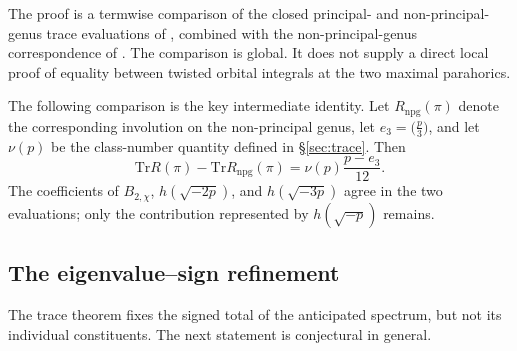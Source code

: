 \documentclass[11pt]{amsart}
\theoremstyle{plain}
\theoremstyle{definition}
\newcommand{\Tr}{\mathrm{Tr}}
\begin{document}
	The proof is a termwise comparison of the closed principal- and
	non-principal-genus trace evaluations of
	\cite{IbukiyamaKatsura,Ibukiyama2019quinary}, combined with the
	non-principal-genus correspondence of \cite{DPRT,Ibukiyama-dim}. The
	comparison is global. It does not supply a direct local proof of equality
	between twisted orbital integrals at the two maximal parahorics.
	
	The following comparison is the key intermediate identity. Let
	$R_{\mathrm{npg}}(\pi)$ denote the corresponding involution on the
	non-principal genus, let $e_3=\bigl(\frac p3\bigr)$, and let $\nu(p)$ be
	the class-number quantity defined in \S\ref{sec:trace}. Then
	\begin{equation}\label{eq:genus-comparison}
		\Tr R(\pi)-\Tr R_{\mathrm{npg}}(\pi)
		=\nu(p)\frac{p-e_3}{12}.
	\end{equation}
	The coefficients of $B_{2,\chi}$, $h(\sqrt{-2p})$, and $h(\sqrt{-3p})$
	agree in the two evaluations; only the contribution represented by
	$h(\sqrt{-p})$ remains.
	
	\subsection{The eigenvalue--sign refinement}
	
	The trace theorem fixes the signed total of the anticipated spectrum, but
	not its individual constituents. The next statement is conjectural in
	general.
	
\end{document}
